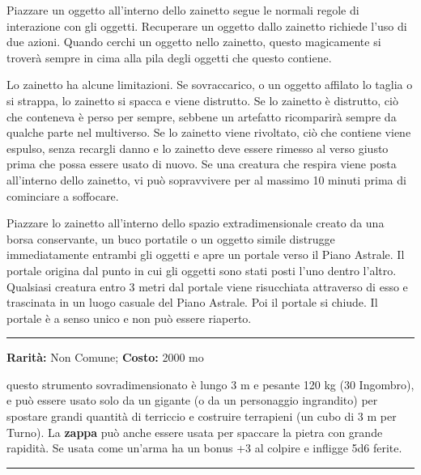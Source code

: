 \begin{multicols}{2}
Piazzare un oggetto all'interno dello zainetto segue le normali regole di interazione con gli oggetti. Recuperare un oggetto dallo zainetto richiede l'uso di due azioni. Quando cerchi un oggetto nello zainetto, questo magicamente si troverà sempre in cima alla pila degli oggetti che questo contiene.

Lo zainetto ha alcune limitazioni. Se sovraccarico, o un oggetto affilato lo taglia o si strappa, lo zainetto si spacca e viene distrutto. Se lo zainetto è distrutto, ciò che conteneva è perso per sempre, sebbene un artefatto ricomparirà sempre da qualche parte nel multiverso. Se lo zainetto viene rivoltato, ciò che contiene viene espulso, senza recargli danno e lo zainetto deve essere rimesso al verso giusto prima che possa essere usato di nuovo. Se una creatura che respira viene posta all'interno dello zainetto, vi può sopravvivere per al massimo 10 minuti prima di cominciare a soffocare.

Piazzare lo zainetto all'interno dello spazio extradimensionale creato da una borsa conservante, un buco portatile o un oggetto simile distrugge immediatamente entrambi gli oggetti e apre un portale verso il Piano Astrale. Il portale origina dal punto in cui gli oggetti sono stati posti l'uno dentro l'altro. Qualsiasi creatura entro 3 metri dal portale viene risucchiata attraverso di esso e trascinata in un luogo casuale del Piano Astrale. Poi il portale si chiude. Il portale è a senso unico e non può essere riaperto.

\smallskip\noindent\rule{\linewidth}{2pt}  \hypertarget{ZappadeiTitani}{}\medskip{}\noindent\label{ZappadeiTitani}

\textbf{Rarità:} Non Comune; \textbf{Costo:} 2000 mo

questo strumento sovradimensionato è lungo 3 m e pesante 120 kg (30 Ingombro), e può essere usato solo da un gigante (o da un personaggio ingrandito) per spostare grandi quantità di terriccio e costruire terrapieni (un cubo di 3 m per Turno). La \textbf{zappa} può anche essere usata per spaccare la pietra con grande rapidità. Se usata come un'arma ha un bonus +3 al colpire e infligge 5d6 ferite.

\smallskip\noindent\rule{\linewidth}{2pt}  \hypertarget{ZoccolidellaVelocità}{}\medskip{}\noindent\label{ZoccolidellaVelocità}


\end{multicols}
